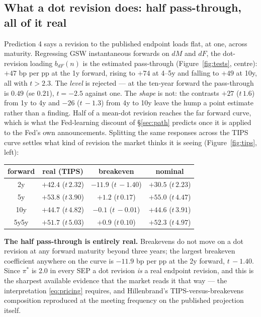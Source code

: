 \documentclass[11pt]{article}
\begin{document}
\subsection{What a dot revision does: half pass-through, all of it real}
\label{sec:test-dot}
Prediction 4 says a revision to the published endpoint loads flat, at one, across maturity.
Regressing GSW instantaneous forwards on $dM$ and $dF$, the dot-revision loading $b_{dF}(n)$ is
the estimated pass-through (Figure~\ref{fig:tests}, centre): $+47$ bp per pp at the 1y forward,
rising to $+74$ at 4--5y and falling to $+49$ at 10y, all with $t>2.3$. The \emph{level} is
rejected --- at the ten-year forward the pass-through is $0.49$ (se $0.21$), $t=-2.5$ against
one. The \emph{shape} is not: the contrasts $+27$ ($t\,1.6$) from 1y to 4y and $-26$
($t\,{-}1.3$) from 4y to 10y leave the hump a point estimate rather than a finding. Half of a
mean-dot revision reaches the far forward curve, which is what the Fed-learning discount of
\S\ref{sec:path} predicts once it is applied to the Fed's own announcements.
Splitting the same responses across the TIPS curve settles what kind of revision the market
thinks it is seeing (Figure~\ref{fig:tips}, left):
\begin{center}\small
\begin{tabular}{cccc}
\toprule
forward & real (TIPS) & breakeven & nominal\\
\midrule
2y & $+42.4$ ($t\,2.32$) & $-11.9$ ($t\,{-}1.40$) & $+30.5$ ($t\,2.23$)\\
5y & $+53.8$ ($t\,3.90$) & $+1.2$ ($t\,0.17$) & $+55.0$ ($t\,4.47$)\\
10y & $+44.7$ ($t\,4.82$) & $-0.1$ ($t\,{-}0.01$) & $+44.6$ ($t\,3.91$)\\
5y5y & $+51.7$ ($t\,5.03$) & $+0.9$ ($t\,0.10$) & $+52.3$ ($t\,4.97$)\\
\bottomrule
\end{tabular}
\end{center}
\noindent \textbf{The half pass-through is entirely real.} Breakevens do not move on a dot
revision at any forward maturity beyond three years; the largest breakeven coefficient anywhere
on the curve is $-11.9$ bp per pp at the 2y forward, $t\,{-}1.40$. Since $\pi^{*}$ is 2.0 in
every SEP a dot revision \emph{is} a real endpoint revision, and this is the sharpest available
evidence that the market reads it that way --- the interpretation \eqref{eq:pricing} requires,
and Hillenbrand's TIPS-versus-breakevens composition reproduced at the meeting frequency on the
published projection itself.
\end{document}
